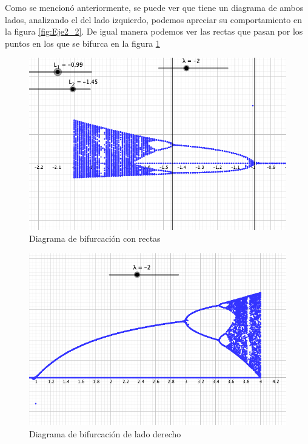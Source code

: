 \documentclass[11pt]{report}
\theoremstyle{plain}
\theoremstyle{definition}
\begin{document}
Como se mencionó anteriormente, se puede ver que tiene un diagrama de ambos lados, analizando el del lado izquierdo, podemos apreciar su comportamiento en la figura \ref{fig:Eje2_2}. De igual manera podemos ver las rectas que pasan por los puntos en los que se bifurca en la figura \ref{fig:Eje2_3}

\begin{figure}[!h] %
	\centering
	\includegraphics[scale=0.3]{caos_2_3.png}
	\caption{Diagrama de bifurcación con rectas}
	\label{fig:Eje2_3}
\end{figure}

\begin{figure}[!h] %
	\centering
	\includegraphics[scale=0.3]{caos_2_4.png}
	\caption{Diagrama de bifurcación de lado derecho}
	\label{fig:Eje2_4}
\end{figure}
\end{document}
